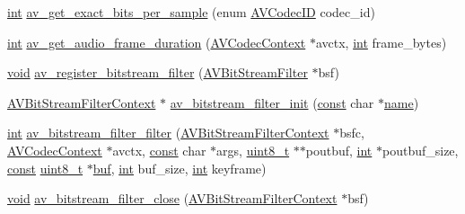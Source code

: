\begin{DoxyCompactItemize}
\item 
\hyperlink{xmltok_8h_a5a0d4a5641ce434f1d23533f2b2e6653}{int} \hyperlink{group__lavc__misc_gadddbcd146ffaf53016bac730c631f7b3}{av\+\_\+get\+\_\+exact\+\_\+bits\+\_\+per\+\_\+sample} (enum \hyperlink{group__lavc__core_gaadca229ad2c20e060a14fec08a5cc7ce}{A\+V\+Codec\+ID} codec\+\_\+id)
\item 
\hyperlink{xmltok_8h_a5a0d4a5641ce434f1d23533f2b2e6653}{int} \hyperlink{group__lavc__misc_ga3266a8c3df0790c62259f91afcde45a9}{av\+\_\+get\+\_\+audio\+\_\+frame\+\_\+duration} (\hyperlink{struct_a_v_codec_context}{A\+V\+Codec\+Context} $\ast$avctx, \hyperlink{xmltok_8h_a5a0d4a5641ce434f1d23533f2b2e6653}{int} frame\+\_\+bytes)
\item 
\hyperlink{sound_8c_ae35f5844602719cf66324f4de2a658b3}{void} \hyperlink{group__lavc__misc_ga520e0d7584b92d70e51ff0fcc3551764}{av\+\_\+register\+\_\+bitstream\+\_\+filter} (\hyperlink{struct_a_v_bit_stream_filter}{A\+V\+Bit\+Stream\+Filter} $\ast$bsf)
\item 
\hyperlink{struct_a_v_bit_stream_filter_context}{A\+V\+Bit\+Stream\+Filter\+Context} $\ast$ \hyperlink{group__lavc__misc_ga4f87a57cd7c08c1d9b9bfe1a4bd611f3}{av\+\_\+bitstream\+\_\+filter\+\_\+init} (\hyperlink{getopt1_8c_a2c212835823e3c54a8ab6d95c652660e}{const} char $\ast$\hyperlink{lib_2expat_8h_a1b49b495b59f9e73205b69ad1a2965b0}{name})
\item 
\hyperlink{xmltok_8h_a5a0d4a5641ce434f1d23533f2b2e6653}{int} \hyperlink{group__lavc__misc_ga1ab3bf4e396f0bbc5151df6af765543d}{av\+\_\+bitstream\+\_\+filter\+\_\+filter} (\hyperlink{struct_a_v_bit_stream_filter_context}{A\+V\+Bit\+Stream\+Filter\+Context} $\ast$bsfc, \hyperlink{struct_a_v_codec_context}{A\+V\+Codec\+Context} $\ast$avctx, \hyperlink{getopt1_8c_a2c212835823e3c54a8ab6d95c652660e}{const} char $\ast$args, \hyperlink{lib-src_2ffmpeg_2win32_2stdint_8h_a9a941819355e6f658991890ff66b4b0e}{uint8\+\_\+t} $\ast$$\ast$poutbuf, \hyperlink{xmltok_8h_a5a0d4a5641ce434f1d23533f2b2e6653}{int} $\ast$poutbuf\+\_\+size, \hyperlink{getopt1_8c_a2c212835823e3c54a8ab6d95c652660e}{const} \hyperlink{lib-src_2ffmpeg_2win32_2stdint_8h_a9a941819355e6f658991890ff66b4b0e}{uint8\+\_\+t} $\ast$\hyperlink{xlstr_8c_a781718f5b53a876fe91c424c4607fa8f}{buf}, \hyperlink{xmltok_8h_a5a0d4a5641ce434f1d23533f2b2e6653}{int} buf\+\_\+size, \hyperlink{xmltok_8h_a5a0d4a5641ce434f1d23533f2b2e6653}{int} keyframe)
\item 
\hyperlink{sound_8c_ae35f5844602719cf66324f4de2a658b3}{void} \hyperlink{group__lavc__misc_gabee15852c201976249e89964161a44b4}{av\+\_\+bitstream\+\_\+filter\+\_\+close} (\hyperlink{struct_a_v_bit_stream_filter_context}{A\+V\+Bit\+Stream\+Filter\+Context} $\ast$bsf)
$$
\end{DoxyCompactItemize}
